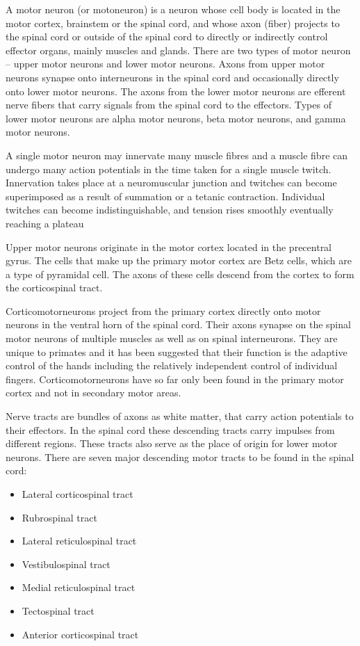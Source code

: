 A motor neuron (or motoneuron) is a neuron whose cell body is located in the motor cortex, brainstem or the spinal cord, and whose axon (fiber) projects to the spinal cord or outside of the spinal cord to directly or indirectly control effector organs, mainly muscles and glands. There are two types of motor neuron -- upper motor neurons and lower motor neurons. Axons from upper motor neurons synapse onto interneurons in the spinal cord and occasionally directly onto lower motor neurons. The axons from the lower motor neurons are efferent nerve fibers that carry signals from the spinal cord to the effectors. Types of lower motor neurons are alpha motor neurons, beta motor neurons, and gamma motor neurons.

A single motor neuron may innervate many muscle fibres and a muscle fibre can undergo many action potentials in the time taken for a single muscle twitch. Innervation takes place at a neuromuscular junction and twitches can become superimposed as a result of summation or a tetanic contraction. Individual twitches can become indistinguishable, and tension rises smoothly eventually reaching a plateau

Upper motor neurons originate in the motor cortex located in the precentral gyrus. The cells that make up the primary motor cortex are Betz cells, which are a type of pyramidal cell. The axons of these cells descend from the cortex to form the corticospinal tract.

Corticomotorneurons project from the primary cortex directly onto motor neurons in the ventral horn of the spinal cord. Their axons synapse on the spinal motor neurons of multiple muscles as well as on spinal interneurons. They are unique to primates and it has been suggested that their function is the adaptive control of the hands including the relatively independent control of individual fingers. Corticomotorneurons have so far only been found in the primary motor cortex and not in secondary motor areas.

Nerve tracts are bundles of axons as white matter, that carry action potentials to their effectors. In the spinal cord these descending tracts carry impulses from different regions. These tracts also serve as the place of origin for lower motor neurons. There are seven major descending motor tracts to be found in the spinal cord:

\begin{itemize}
\tightlist
\item
  Lateral corticospinal tract
\item
  Rubrospinal tract
\item
  Lateral reticulospinal tract
\item
  Vestibulospinal tract
\item
  Medial reticulospinal tract
\item
  Tectospinal tract
\item
  Anterior corticospinal tract
\end{itemize}

